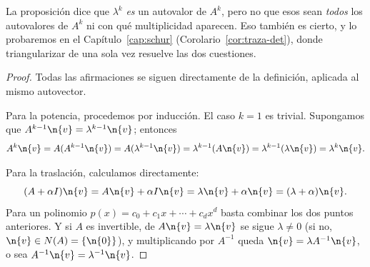 \begin{remark}
La proposición dice que $\lambda^k$ \emph{es} un autovalor de $A^k$, pero no que esos
sean \emph{todos} los autovalores de $A^k$ ni con qué multiplicidad aparecen. Eso
también es cierto, y lo probaremos en el Capítulo~\ref{cap:schur}
(Corolario~\ref{cor:traza-det}), donde triangularizar de una sola vez resuelve las dos
cuestiones.
\end{remark}

\begin{proof}
Todas las afirmaciones se siguen directamente de la definición, aplicada al mismo autovector.

Para la potencia, procedemos por inducción. El caso $k=1$ es trivial. Supongamos que $A^{k-1}\n{v} = \lambda^{k-1}\n{v}$; entonces
\[
A^k \n{v} = A(A^{k-1}\n{v}) = A(\lambda^{k-1}\n{v}) = \lambda^{k-1}(A\n{v}) = \lambda^{k-1}(\lambda \n{v}) = \lambda^k \n{v}.
\]

Para la traslación, calculamos directamente:
\[
(A + \alpha I)\n{v} = A\n{v} + \alpha I\n{v} = \lambda \n{v} + \alpha \n{v} = (\lambda + \alpha)\n{v}.
\]
Para un polinomio $p(x)=c_0+c_1x+\cdots+c_dx^d$ basta combinar los dos puntos anteriores.
Y si $A$ es invertible, de $A\n{v}=\lambda\n{v}$ se sigue $\lambda\neq0$ (si no,
$\n{v}\in N(A)=\{\n{0}\}$), y multiplicando por $A^{-1}$ queda
$\n{v}=\lambda A^{-1}\n{v}$, o sea $A^{-1}\n{v}=\lambda^{-1}\n{v}$.
\end{proof}

